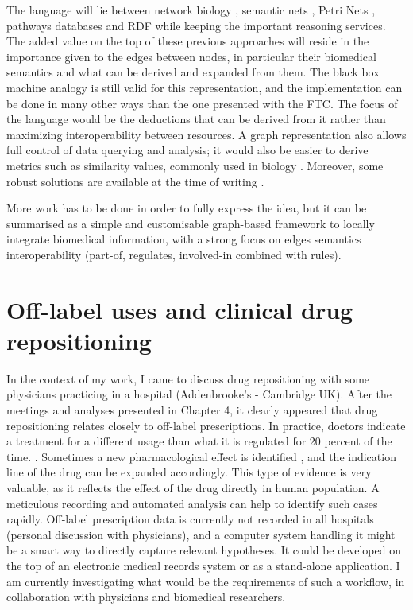 The language will lie between network biology \citep{ravasz2002hierarchical}, semantic nets \citep{schubert1978structure}, Petri Nets \citep{murata1989petri}, pathways databases \citep{schaefer2009pid} and RDF while keeping the important reasoning services. The added value on the top of these previous approaches will reside in the importance given to the edges between nodes, in particular their biomedical semantics and what can be derived and expanded from them. The black box machine analogy is still valid for this representation, and the implementation can be done in many other ways than the one presented with the FTC. The focus of the language would be the deductions that can be derived from it rather than maximizing interoperability between resources. A graph representation also allows full control of data querying and analysis; it would also be easier to derive metrics such as similarity values, commonly used in biology \citep{stevens2007using}. Moreover, some robust solutions are available at the time of writing \citep{have2013graph}.

More work has to be done in order to fully express the idea, but it can be summarised as a simple and customisable graph-based framework to locally integrate biomedical information, with a strong focus on edges semantics interoperability (part-of, regulates, involved-in combined with rules).

\section{Off-label uses and clinical drug repositioning}
In the context of my work, I came to discuss drug repositioning with some physicians practicing in a hospital (Addenbrooke's - Cambridge UK). After the meetings and analyses presented in Chapter 4, it clearly appeared that drug repositioning relates closely to off-label prescriptions. In practice, doctors indicate a treatment for a different usage than what it is regulated for 20 percent of the time. \citep{cras2007off}. Sometimes a new pharmacological effect is identified \citep{stephens2009dark}, and the indication line of the drug can be expanded accordingly. This type of evidence is very valuable, as it reflects the effect of the drug directly in human population. A meticulous recording and automated analysis can help to identify such cases rapidly. Off-label prescription data is currently not recorded in all hospitals (personal discussion with physicians), and a computer system handling it might be a smart way to directly capture relevant hypotheses. It could be developed on the top of an electronic medical records system \citep{cras2007off} or as a stand-alone application. I am currently investigating what would be the requirements of such a workflow, in collaboration with physicians and biomedical researchers.

